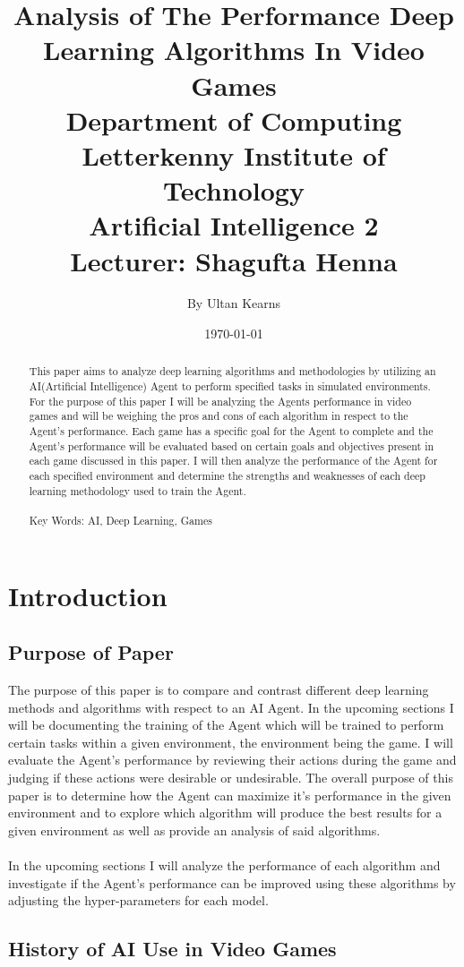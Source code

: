 \documentclass[conference]{IEEEtran}
\title{
Analysis of The Performance Deep Learning Algorithms In Video Games\\
\vspace{5mm}
\large Department of Computing \\
\vspace{3mm} 
\large Letterkenny Institute of Technology \\
\vspace{3mm} 
\large Artificial Intelligence 2 \\
\vspace{3mm} 
\large Lecturer: Shagufta Henna
}
\author{By Ultan Kearns}
\date{\today}
\begin{document}
\maketitle
\begin{abstract}
    This paper aims to analyze deep learning algorithms and methodologies by utilizing an AI(Artificial Intelligence) Agent to perform specified tasks in simulated environments.  For the purpose of this paper I will be analyzing the Agents performance in video games and will be weighing the pros and cons of each algorithm in respect to the Agent's performance.  Each game has a specific goal for the Agent to complete and the Agent's performance will be evaluated based on certain goals and objectives present in each game discussed in this paper.  I will then analyze the performance of the Agent for each specified environment and determine the strengths and weaknesses of each deep learning methodology used to train the Agent. 
    \\
    \\
    Key Words: AI, Deep Learning, Games
\end{abstract}
\section{Introduction}
\subsection{Purpose of Paper}
The purpose of this paper is to compare and contrast different deep learning methods and algorithms with respect to an AI Agent.  In the upcoming sections I will be documenting the training of the Agent which will be trained to perform certain tasks within a given environment, the environment being the game.  I will evaluate the Agent's performance by reviewing their actions during the game and judging if these actions were desirable or undesirable.  The overall purpose of this paper is to determine how the Agent can maximize it's performance in the given environment and to explore which algorithm will produce the best results for a given environment as well as provide an analysis of said algorithms.
\\
\\
In the upcoming sections I will analyze the performance of each algorithm and investigate if the Agent's performance can be improved using these algorithms by adjusting the hyper-parameters for each model.
\subsection{History of AI Use in Video Games}
\end{document}
